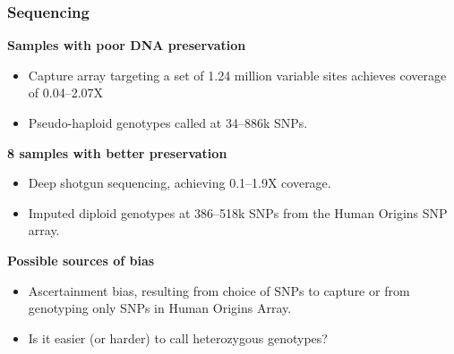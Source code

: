 \documentclass[pdftex,12pt,dvipsnames]{beamer}
\begin{document}
\begin{frame}
  \frametitle{Sequencing}
\textbf{Samples with poor DNA preservation}\\[-\baselineskip]
\begin{itemize}
\item Capture array targeting a set of 1.24 million variable sites
  achieves coverage of 0.04--2.07X
\item Pseudo-haploid genotypes called at 34--886k SNPs.
\end{itemize}

\textbf{8 samples with better preservation}\\[-\baselineskip]
\begin{itemize}
  \item Deep shotgun sequencing, achieving 0.1--1.9X coverage.
  \item Imputed diploid genotypes at 386--518k SNPs from the Human
    Origins SNP array.
\end{itemize}

\textbf{Possible sources of bias}\\[-\baselineskip]
\begin{itemize}
  \item Ascertainment bias, resulting from choice of SNPs to capture
    or from genotyping only SNPs in Human Origins Array.
  \item Is it easier (or harder) to call heterozygous genotypes?
\end{itemize}    
\end{frame}
\end{document}
